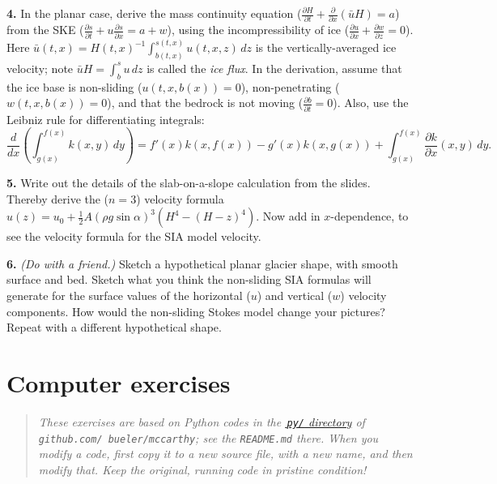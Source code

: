 \documentclass[12pt]{amsart}
\newcommand{\prob}[1]{\bigskip\noindent\textbf{#1.}\quad }
\begin{document}
\prob{4}  In the planar case, derive the mass continuity equation ($\frac{\partial H}{\partial t} + \frac{\partial}{\partial x}(\bar u H) = a$) from the SKE ($\frac{\partial s}{\partial t} + u \frac{\partial s}{\partial x} = a + w$), using the incompressibility of ice ($\frac{\partial u}{\partial x} + \frac{\partial w}{\partial z} = 0$).  Here $\bar u(t,x) = H(t,x)^{-1} \int_{b(t,x)}^{s(t,x)} u(t,x,z)\,dz$ is the vertically-averaged ice velocity; note $\bar u H = \int_b^s u\,dz$ is called the \emph{ice flux}.  In the derivation, assume that the ice base is non-sliding ($u(t,x,b(x))=0$), non-penetrating ($w(t,x,b(x))=0$), and that the bedrock is not moving ($\frac{\partial b}{\partial t} = 0$).  Also, use the Leibniz rule for differentiating integrals:
  $$\frac{d}{dx}\left(\int_{g(x)}^{f(x)} k(x,y)\,dy\right) = f'(x) k(x,f(x)) - g'(x) k(x,g(x)) + \int_{g(x)}^{f(x)} \frac{\partial k}{\partial x}(x,y)\,dy.$$

\prob{5}  Write out the details of the slab-on-a-slope calculation from the slides.  Thereby derive the ($n=3$) velocity formula $u(z) = u_0 + \frac{1}{2} A (\rho g \sin\alpha)^3  \left(H^4 - (H-z)^4\right)$.  Now add in $x$-dependence, to see the velocity formula for the SIA model velocity.

\prob{6}  \emph{(Do with a friend.)}  Sketch a hypothetical planar glacier shape, with smooth surface and bed.  Sketch what you think the non-sliding SIA formulas will generate for the surface values of the horizontal ($u$) and vertical ($w$) velocity components.  How would the non-sliding Stokes model change your pictures?  Repeat with a different hypothetical shape.

\section*{Computer exercises}

\begin{quote}
\emph{These exercises are based on Python codes in the \href{https://github.com/bueler/mccarthy/tree/master/py}{\,\emph{\texttt{py/}} directory} of \emph{\texttt{github.com/ bueler/mccarthy}}; see the \emph{\texttt{README.md}} there.  When you modify a code, first copy it to a new source file, with a new name, and then modify that.  Keep the original, running code in pristine condition!}
\end{quote}
\end{document}
